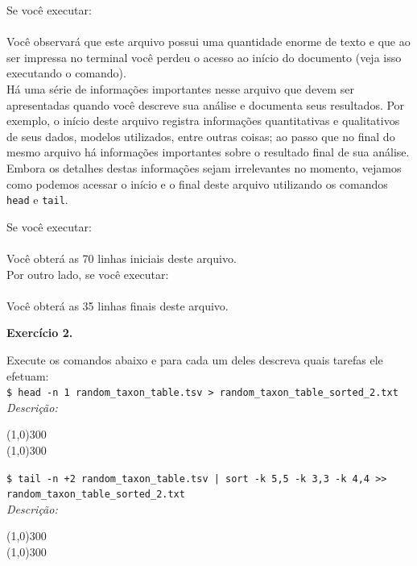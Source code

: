 \begin{refsection}
Se você executar:\\
\\

Você observará que este arquivo possui uma quantidade enorme de texto e que ao ser impressa no terminal você perdeu o acesso ao início do documento (veja isso executando o comando).\\
Há uma série de informações importantes nesse arquivo que devem ser apresentadas quando você descreve sua análise e documenta seus resultados. Por exemplo, o início deste arquivo registra informações quantitativas e qualitativos de seus dados, modelos utilizados, entre outras coisas; ao passo que no final do mesmo arquivo há informações importantes sobre o resultado final de sua análise. Embora os detalhes destas informações sejam irrelevantes no momento, vejamos como podemos acessar o início e o final deste arquivo utilizando os comandos \texttt{head} e \texttt{tail}.

Se você executar:\\
\\

Você obterá as 70 linhas iniciais deste arquivo.\\

Por outro lado, se você executar:\\
\\

Você obterá as 35 linhas finais deste arquivo.\\

\begin{blackBlock}{\textbf{Exercício 2.}}\label{tut2:ex:2.\arabic{ex}}

Execute os comandos abaixo e para cada um deles descreva quais tarefas ele efetuam:\\
 
\small{\texttt{\$ head -n 1 random\_taxon\_table.tsv > random\_taxon\_table\_sorted\_2.txt}}\\

\textit{Descrição:}
\begin{center}
\line(1,0){300}\\
\line(1,0){300}\\
\end{center}

\texttt{\$ tail -n +2 random\_taxon\_table.tsv | sort -k 5,5 -k 3,3 -k 4,4 >> random\_taxon\_table\_sorted\_2.txt}
\\
\textit{Descrição:}
\begin{center}
\line(1,0){300}\\
\line(1,0){300}\\
\end{center}


\end{blackBlock}
\end{refsection}
